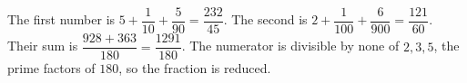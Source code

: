 The first number is $5+\dfrac{1}{10}+\dfrac{5}{90}=\dfrac{232}{45}$. The second is $2+\dfrac{1}{100}+\dfrac{6}{900}=\dfrac{121}{60}$. Their sum is $\dfrac{928+363}{180}=\boxed{\dfrac{1291}{180}}$. The numerator is divisible by none of $2,3,5$, the prime factors of $180$, so the fraction is reduced.
